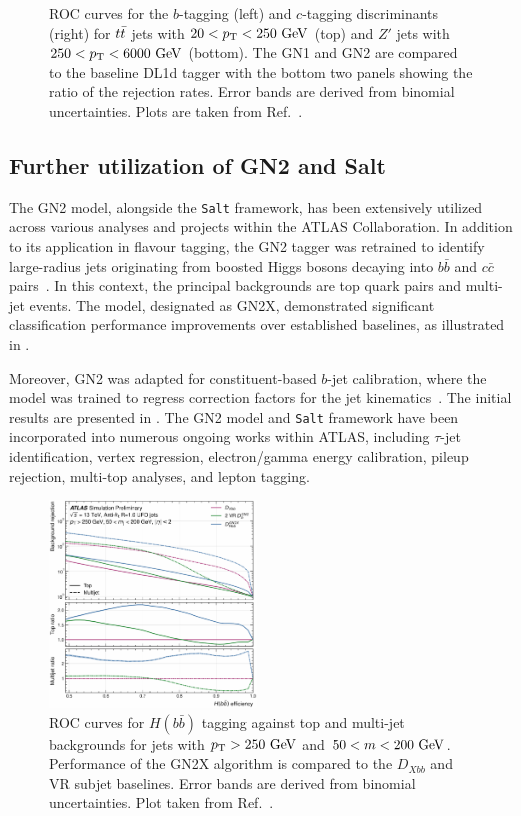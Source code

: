 \begin{figure}[ht]
    \caption{ROC curves for the $b$-tagging (left) and $c$-tagging discriminants (right) for $t\bar{t}$ jets with $20 < \pt < 250~\GeV$ (top) and $Z'$ jets with $250 < \pt < 6000~\GeV$ (bottom). The GN1 and GN2 are compared to the baseline DL1d tagger with the bottom two panels showing the ratio of the rejection rates. Error bands are derived from binomial uncertainties. Plots are taken from Ref.~\cite{GN2Plots}.}
    \label{fig:gn2}
\end{figure}

\subsection{Further utilization of GN2 and Salt}

The GN2 model, alongside the \texttt{Salt} framework, has been extensively utilized across various analyses and projects within the ATLAS Collaboration.
In addition to its application in flavour tagging, the GN2 tagger was retrained to identify large-radius jets originating from boosted Higgs bosons decaying into $b\bar{b}$ and $c\bar{c}$ pairs~\cite{GN2X}.
In this context, the principal backgrounds are top quark pairs and multi-jet events.
The model, designated as GN2X, demonstrated significant classification performance improvements over established baselines, as illustrated in .

Moreover, GN2 was adapted for constituent-based $b$-jet calibration, where the model was trained to regress correction factors for the jet kinematics~\cite{GN2Calib}.
The initial results are presented in .
The GN2 model and \texttt{Salt} framework have been incorporated into numerous ongoing works within ATLAS, including $\tau$-jet identification, vertex regression, electron/gamma energy calibration, pileup rejection, multi-top analyses, and lepton tagging.

\begin{figure}
    \centering
    \includegraphics[width=0.49\textwidth]{figures/flavour_tagging/gn2x.pdf}
    \caption{ROC curves for $H(b\bar{b})$ tagging against top and multi-jet backgrounds for jets with $\pt>250~\GeV$ and $50<m<200~\GeV$. Performance of the GN2X algorithm is compared to the $D_{Xbb}$ and VR subjet baselines. Error bands are derived from binomial uncertainties. Plot taken from Ref.~\cite{GN2X}.}
    \label{fig:gn2x}
\end{figure}

